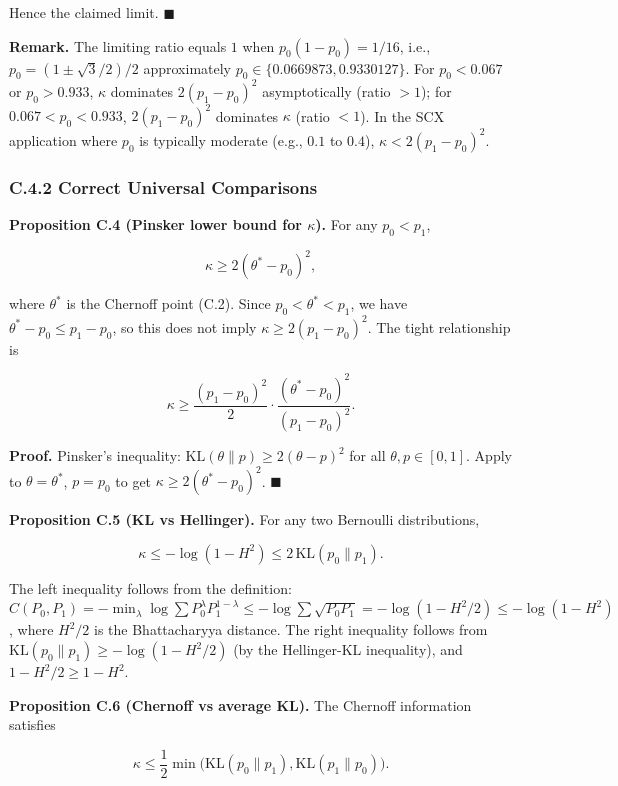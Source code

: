 \documentclass[
  12pt,
]{article}
\begin{document}
Hence the claimed limit. \(\blacksquare\)

\textbf{Remark.} The limiting ratio equals \(1\) when
\(p_0(1-p_0) = 1/16\), i.e., \(p_0 = (1\pm\sqrt{3}/2)/2\) approximately
\(p_0 \in \{0.0669873, 0.9330127\}\). For \(p_0 < 0.067\) or
\(p_0 > 0.933\), \(\kappa\) dominates \(2(p_1-p_0)^2\) asymptotically
(ratio \(>1\)); for \(0.067 < p_0 < 0.933\), \(2(p_1-p_0)^2\) dominates
\(\kappa\) (ratio \(<1\)). In the SCX application where \(p_0\) is
typically moderate (e.g., \(0.1\) to \(0.4\)),
\(\kappa < 2(p_1-p_0)^2\).

\subsubsection{C.4.2 Correct Universal
Comparisons}\label{c.4.2-correct-universal-comparisons}

\textbf{Proposition C.4 (Pinsker lower bound for \(\kappa\)).} For any
\(p_0 < p_1\),

\[
\kappa \geq 2(\theta^* - p_0)^2,
\]

where \(\theta^*\) is the Chernoff point (C.2). Since
\(p_0 < \theta^* < p_1\), we have \(\theta^* - p_0 \leq p_1 - p_0\), so
this does not imply \(\kappa \geq 2(p_1-p_0)^2\). The tight relationship
is

\[
\kappa \geq \frac{(p_1-p_0)^2}{2} \cdot \frac{(\theta^*-p_0)^2}{(p_1-p_0)^2}.
\]

\textbf{Proof.} Pinsker's inequality:
\(\text{KL}(\theta\|p) \geq 2(\theta-p)^2\) for all
\(\theta,p\in[0,1]\). Apply to \(\theta = \theta^*\), \(p = p_0\) to get
\(\kappa \geq 2(\theta^* - p_0)^2\). \(\blacksquare\)

\textbf{Proposition C.5 (KL vs Hellinger).} For any two Bernoulli
distributions,

\[
\kappa \leq -\log(1-H^2) \leq 2\,\text{KL}(p_0\|p_1).
\]

The left inequality follows from the definition:
\(C(P_0,P_1) = -\min_{\lambda}\log\sum P_0^\lambda P_1^{1-\lambda} \leq -\log\sum \sqrt{P_0 P_1} = -\log(1-H^2/2) \leq -\log(1-H^2)\),
where \(H^2/2\) is the Bhattacharyya distance. The right inequality
follows from \(\text{KL}(p_0\|p_1) \geq -\log(1-H^2/2)\) (by the
Hellinger-KL inequality), and \(1-H^2/2 \geq 1-H^2\).

\textbf{Proposition C.6 (Chernoff vs average KL).} The Chernoff
information satisfies

\[
\kappa \leq \frac{1}{2}\min\bigl(\text{KL}(p_0\|p_1), \text{KL}(p_1\|p_0)\bigr).
\]
\end{document}
